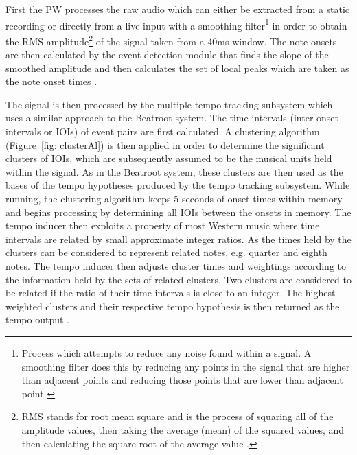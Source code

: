 \documentclass[a4paper, 11pt]{article}
\begin{document}
First the PW processes the raw audio which can either be extracted from a static recording or directly from a live input with a smoothing filter\footnote{Process which attempts to reduce any noise found within a signal. A smoothing filter does this by reducing any points in the signal that are higher than adjacent points and reducing those points that are lower than adjacent point \cite{pragmaticSig}} in order to obtain the RMS amplitude\footnote{RMS stands for root mean square and is the process of squaring all of the amplitude values, then taking the average (mean) of the squared values, and then calculating the square root of the average value \cite{rms}.} of the signal taken from a 40ms window. The note onsets are then calculated by the event detection module that finds the slope of the smoothed amplitude and then calculates the set of local peaks which are taken as the note onset times \cite{dixonGoeblWidmer}. 

The signal is then processed by the multiple tempo tracking subsystem which uses a similar approach to the Beatroot system. The time intervals (inter-onset intervals or IOIs) of event pairs are first calculated. A clustering algorithm (Figure~\ref{fig: clusterAl}) is then applied in order to determine the significant clusters of IOIs, which are subsequently assumed to be the musical units held within the signal. As in the Beatroot system, these clusters are then used as the bases of the tempo hypotheses produced by the tempo tracking subsystem. While running, the clustering algorithm keeps 5 seconds of onset times within memory and begins processing by determining all IOIs between the onsets in memory. The tempo inducer then exploits a property of most Western music where time intervals are related by small approximate integer ratios. As the times held by the clusters can be considered to represent related notes, e.g. quarter and eighth notes. The tempo inducer then adjusts cluster times and weightings according to the information held by the sets of related clusters. Two clusters are considered to be related if the ratio of their time intervals is close to an integer. The highest weighted clusters and their respective tempo hypothesis is then returned as the tempo output \cite{dixonGoeblWidmer}.
\end{document}
